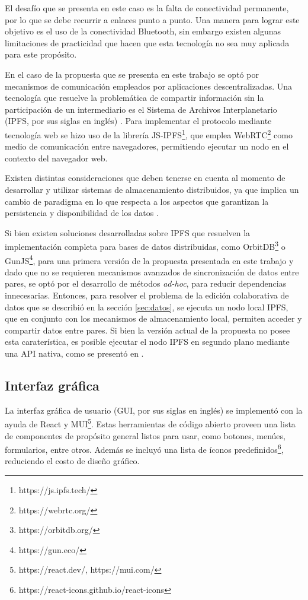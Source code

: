 El desafío que se presenta en este caso es la falta de conectividad permanente, por lo que se debe recurrir a enlaces punto a punto. Una manera para lograr este objetivo es el uso de la conectividad Bluetooth, sin embargo existen algunas limitaciones de practicidad que hacen que esta tecnología no sea muy aplicada para este propósito.

En el caso de la propuesta que se presenta en este trabajo se optó por mecanismos de comunicación empleados por aplicaciones descentralizadas. Una tecnología que resuelve la problemática de compartir información sin la participación de un intermediario es el Sistema de Archivos Interplanetario (IPFS, por sus siglas en inglés) \cite{tschorsch2022}. Para implementar el protocolo mediante tecnología web se hizo uso de la librería JS-IPFS\footnote{https://js.ipfs.tech/}, que emplea WebRTC\footnote{https://webrtc.org/} como medio de comunicación entre navegadores, permitiendo ejecutar un nodo en el contexto del navegador web. 

Existen distintas consideraciones que deben tenerse en cuenta al momento de desarrollar y utilizar sistemas de almacenamiento distribuidos, ya que implica un cambio de paradigma en lo que respecta a los aspectos que garantizan la persistencia y disponibilidad de los datos \cite{guidi2021,shen2019}. 

Si bien existen soluciones desarrolladas sobre IPFS que resuelven la implementación completa para bases de datos distribuidas, como OrbitDB\footnote{https://orbitdb.org/} o GunJS\footnote{https://gun.eco/}, para una primera versión de la propuesta presentada en este trabajo y dado que no se requieren mecanismos avanzados de sincronización de datos entre pares, se optó por el desarrollo de métodos \textit{ad-hoc}, para reducir dependencias innecesarias. Entonces, para resolver el problema de la edición colaborativa de datos que se describió en la sección \ref{sec:datos}, se ejecuta un nodo local IPFS, que en conjunto con los mecanismos de almacenamiento local, permiten acceder y compartir datos entre pares. Si bien la versión actual de la propuesta no posee esta caraterística, es posible ejecutar el nodo IPFS en segundo plano mediante una API nativa, como se presentó en \cite{cristea2020}. 

\subsection{Interfaz gráfica}
La interfaz gráfica de usuario (GUI, por sus siglas en inglés) se implementó con la ayuda de React y MUI\footnote{https://react.dev/, https://mui.com/}. Estas herramientas de código abierto proveen una lista de componentes de propósito general listos para usar, como botones, menúes, formularios, entre otros. Además se incluyó una lista de íconos predefinidos\footnote{https://react-icons.github.io/react-icons}, reduciendo el costo de diseño gráfico. 


